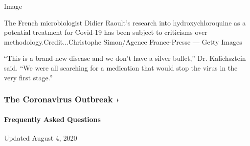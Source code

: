 Image

The French microbiologist Didier Raoult's research into
hydroxychloroquine as a potential treatment for Covid-19 has been
subject to criticisms over methodology.Credit...Christophe Simon/Agence
France-Presse --- Getty Images

``This is a brand-new disease and we don't have a silver bullet,'' Dr.
Kalichsztein said. ``We were all searching for a medication that would
stop the virus in the very first stage.''

\href{https://www.nytimes3xbfgragh.onion/news-event/coronavirus?action=click\&pgtype=Article\&state=default\&region=MAIN_CONTENT_3\&context=storylines_faq}{}

\hypertarget{the-coronavirus-outbreak-}{%
\subsubsection{The Coronavirus Outbreak
›}\label{the-coronavirus-outbreak-}}

\hypertarget{frequently-asked-questions}{%
\paragraph{Frequently Asked
Questions}\label{frequently-asked-questions}}

Updated August 4, 2020

